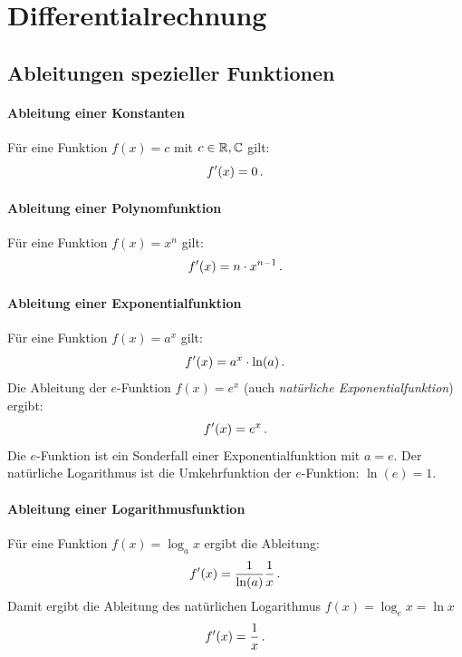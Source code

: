\chapter{Differentialrechnung}\label{chap: Differentialrechnung}

\section{Ableitungen spezieller Funktionen}\label{sec: Ableitung_spezFunktionen}
\subsubsection{Ableitung einer Konstanten}
Für eine Funktion $f(x) = c$ mit $c \in \mathbb{R}, \mathbb{C}$ gilt:
\begin{equation}
    f'(x) = 0\,.
\end{equation}

\subsubsection{Ableitung einer Polynomfunktion}
Für eine Funktion $f(x) = x^n$ gilt:
\begin{equation}
    f'(x) = n \cdot x^{n-1} \,.
\end{equation}

\subsubsection{Ableitung einer Exponentialfunktion}
Für eine Funktion $f(x) = a^x$ gilt:
\begin{equation}
    f'(x) = a^x \cdot \ln(a) \,.
\end{equation}
Die Ableitung der $e$-Funktion $f(x) = e^x$  (auch \textit{natürliche Exponentialfunktion}) ergibt:
\begin{equation}
    f'(x) = e^x \,.
\end{equation}
Die $e$-Funktion ist ein Sonderfall einer Exponentialfunktion mit $a = e$. Der natürliche Logarithmus ist die Umkehrfunktion der $e$-Funktion: $\ln(e) = 1$.

\subsubsection{Ableitung einer Logarithmusfunktion}
Für eine Funktion $f(x) = \log_a{x}$ ergibt die Ableitung:
\begin{equation}
    f'(x) = \frac{1}{\ln(a)}\frac{1}{x} \,.
\end{equation}
Damit ergibt die Ableitung des natürlichen Logarithmus $f(x) = \log_e{x} = \ln{x}$
\begin{equation}
    f'(x) = \frac{1}{x} \,.
\end{equation}

